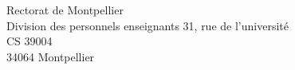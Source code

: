 \documentclass[11pt,%
twoside,%
leqno,%
fleqn,%
francais,%
origdate]{lettre}
\makeatletter
\newcommand*{\NoRule}{\renewcommand*{\rule@length}{0}}
\makeatother
\begin{document}
%
%
%
%
%
%
\begin{letter}{Rectorat de Montpellier\\
    Division des personnels enseignants
    31, rue de l'université\\
    CS 39004\\
    34064 Montpellier
  }
  \address{Les Castaniès\\
    11250 PREIXAN%
  }
  \nofax
  \marge{15mm}                          %
  \francais
  \signature{Philippe Ivaldi\\
    \texttt{[image: /home/pi/Documents/paperasse/administratif/signature.png]}%
  }

\end{letter}
\end{document}
